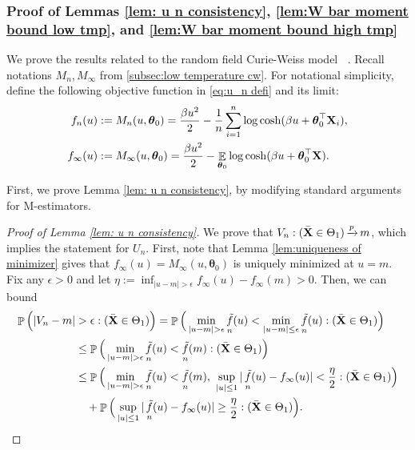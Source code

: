 \documentclass[preprint,reqno]{imsart}
\newcommand{\ttheta}{\boldsymbol{\theta}}
\DeclareMathOperator{\ft}{\tilde{\mathnormal f}}
\DeclareMathOperator{\QQCW}{\QQ_{\ttheta}^{\text{CW}}}
\DeclareMathOperator{\xp}{\xrightarrow{\mathnormal p}}
\DeclareMathOperator{\EE}{\mathbb{E}}
\DeclareMathOperator{\PP}{\mathbb{P}}
\DeclareMathOperator{\QQ}{\mathbb{Q}}
\newcommand{\X}{\mathbf{X}}
\DeclareMathOperator{\sumin}{\sum_{\mathnormal i=1}^{\mathnormal n}}
\begin{document}
\begin{appendix}
\subsubsection{Proof of Lemmas \ref{lem: u n consistency}, \ref{lem:W bar moment bound low tmp}, and \ref{lem:W bar moment bound high tmp}}\label{subsec:rfim concentration}
We prove the results related to the random field Curie-Weiss model $\QQCW$. Recall notations $M_n, M_\infty$ from \cref{subsec:low temperature cw}. For notational simplicity, define the following objective function in \eqref{eq:u_n defi} and its limit:
\begin{align*}
    f_n(u) &:= M_{n}(u,\ttheta_0) = \frac{\beta u^2}{2} - \frac{1}{n} \sumin \log \cosh(\beta u + \ttheta_0^\top \X_i), \\
    f_{\infty}(u) &:= M_{\infty}(u,\ttheta_0) = \frac{\beta u^2}{2} - \EE_{\ttheta_0} \log \cosh(\beta u + \ttheta_0^\top \X).
\end{align*}

First, we prove Lemma \ref{lem: u n consistency}, by modifying standard arguments for M-estimators.

\begin{proof}[Proof of Lemma \ref{lem: u n consistency}]

%
%
%
%
%
%
%
%
%
%
%
We prove that $V_n : (\bar{\X} \in \Theta_1) \xp m$, which implies the statement for $U_n$. First, note that Lemma \ref{lem:uniqueness of minimizer} gives that $f_\infty(u) = M_{\infty}(u, \ttheta_0)$ is uniquely minimized at $u = m$.
Fix any $\epsilon > 0$ and let $\eta := \inf_{|u - m|>\epsilon} f_{\infty}(u) - f_{\infty}(m) > 0$. Then, we can bound
\begin{align}
\PP\Big(|V_n - m| &> \epsilon : (\bar{\X} \in \Theta_1)\Big) = \PP\Big(\min_{|u - m| > \epsilon} \ft_n(u) < \min_{|u-m| \le \epsilon} \ft_n(u) : (\bar{\X} \in \Theta_1)\Big) \notag \\
&\le \PP\Big(\min_{|u-m| > \epsilon} \ft_n(u) < \ft_n(m) : (\bar{\X} \in \Theta_1)\Big) \notag \\
&\le \PP \Big(\min_{|u-m| > \epsilon} \ft_n(u) < \ft_n(m), ~\sup_{|u| \le 1} |\ft_n(u) - f_{\infty}(u)| < \frac{\eta}{2} : (\bar{\X} \in \Theta_1)\Big) \label{eq:lem 6.5 proof} \\
&\quad + \PP \Big(\sup_{|u| \le 1} |\ft_n(u) - f_{\infty}(u)| \ge \frac{\eta}{2} : (\bar{\X} \in \Theta_1)\Big). \notag
\end{align}


\end{proof}
\end{appendix}
\end{document}
